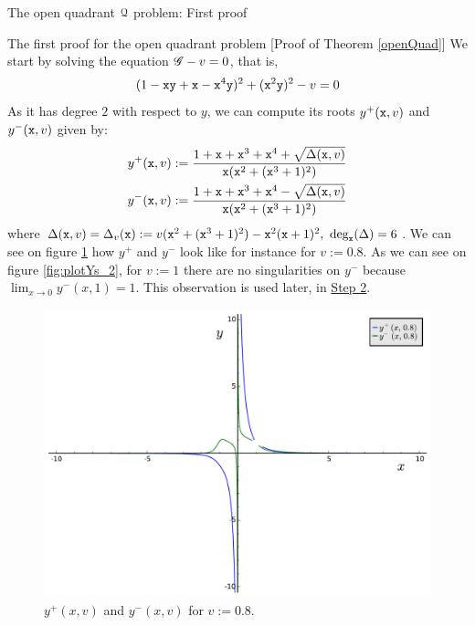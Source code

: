 \documentclass[11pt, a4paper, english, twoside, notitlepage, openright]{report}
\begin{document}
\begin{chapter}{The open quadrant $\mathcal{Q}$ problem: First proof}
\begin{section}{The first proof for the open quadrant problem} [Proof of Theorem \ref{openQuad}]
We start by solving the equation $\mathscr{G}-v=0$, that is, 
$$
(1-{\tt x}{\tt y}+{\tt x}-{\tt x}^4{\tt y})^2+({\tt x}^2{\tt y})^2-v=0
$$ 
As it has degree $2$ with respect to $y$, we can compute its roots $y^+({\tt x},v)$ and $y^-({\tt x},v)$ given by:
\begin{equation*}
\begin{aligned}
y^+({\tt x},v)&:=\frac{1+{\tt x}+{\tt x}^3+{\tt x}^4+\sqrt{\Delta({\tt x},v)}}{{\tt x}({\tt x}^2+({\tt x}^3+1)^2)}\\
y^-({\tt x},v)&:=\frac{1+{\tt x}+{\tt x}^3+{\tt x}^4-\sqrt{\Delta({\tt x},v)}}{{\tt x}({\tt x}^2+({\tt x}^3+1)^2)}\\
\end{aligned}
\end{equation*}
where $\Delta({\tt x},v)=\Delta_v({\tt x}):=v({\tt x}^2+({\tt x}^3+1)^2)-{\tt x}^2({\tt x}+1)^2,\ \text{deg}_{\tt x}(\Delta)=6$. We can see on figure \ref{fig:plotYs_1} how $y^+$ and $y^-$ look like for instance for $v:=0.8$. As we can see on figure \ref{fig:plotYs_2}, for $v:=1$ there are no singularities on $y^-$ because $\lim_{x\rightarrow0}y^-(x,1)=1$. This observation is used later, in \hyperref[step2]{Step 2}.
\begin{figure}[h]
\centering
\includegraphics[width=1\textwidth]{plots/ch1_06_sols.pdf}
\caption{$y^+(x,v)$ and $y^-(x,v)$ for $v:= 0.8$.\label{fig:plotYs_1}}
\end{figure}
\begin{figure}[h]
\centering

\end{figure}
\end{section}
\end{chapter}
\end{document}
